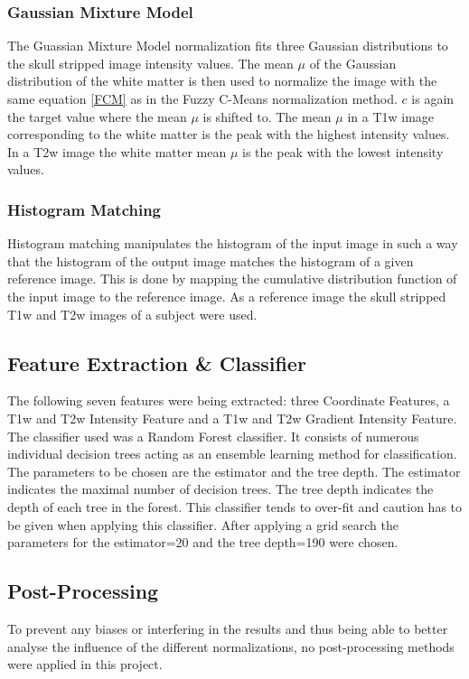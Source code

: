 \documentclass[journal]{IEEEtran}
\begin{document}
	\subsubsection{Gaussian Mixture Model}
	The Guassian Mixture Model normalization fits three Gaussian distributions to the skull stripped image intensity values. 
	The mean $\mu$ of the Gaussian distribution of the white matter is then used to normalize the image with the same equation \ref{FCM} as in the Fuzzy C-Means normalization method. 
	$c$ is again the target value where the mean $\mu$ is shifted to. 
	The mean $\mu$ in a T1w image corresponding to the white matter is the peak with the highest intensity values. 
	In a T2w image the white matter mean $\mu$ is the peak with the lowest intensity values. 
	\smallskip

	\subsubsection{Histogram Matching}
	Histogram matching manipulates the histogram of the input image in such a way that the histogram of the output image matches the histogram of a given reference image. 
	This is done by mapping the cumulative distribution function of the input image to the reference image.
	As a reference image the skull stripped T1w and T2w images of a subject were used. 
	\smallskip
	

\subsection{Feature Extraction \& Classifier} 
	The following seven features were being extracted: three Coordinate Features, a T1w and T2w Intensity Feature and a T1w and T2w Gradient Intensity Feature.\\
	The classifier used was a Random Forest classifier. It consists of numerous individual decision trees acting as an ensemble learning method for classification.
	The parameters to be chosen are the estimator and the tree depth. The estimator indicates the maximal number of decision trees. 
	The tree depth indicates the depth of each tree in the forest.
	This classifier tends to over-fit and caution has to be given when applying this classifier.
	After applying a grid search the parameters for the estimator=20 and the tree depth=190 were chosen. 
	
	
\subsection{Post-Processing} 
	To prevent any biases or interfering in the results and thus being able to better analyse the influence of the different normalizations, no post-processing methods were applied in this project. 
	
\end{document}
